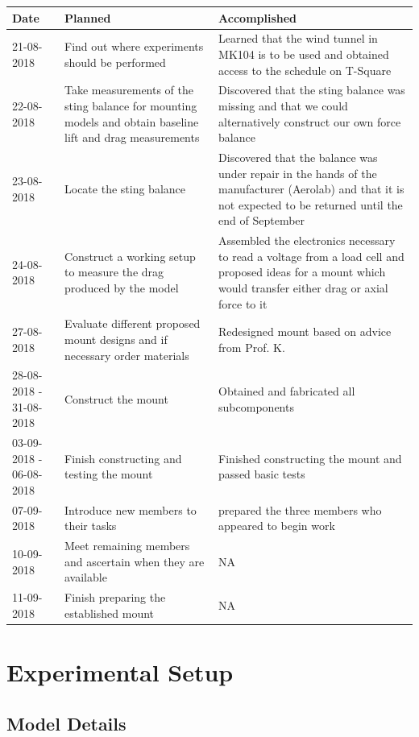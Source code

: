 \documentclass[12pt]{report} %
\begin{document}
\begin{tabular}{|l|p{10cm}|p{10cm}|}
\hline
Date & Planned & Accomplished \\ \hline
21-08-2018 & Find out where experiments should be performed & Learned that the wind tunnel in MK104 is to be
used and obtained access to the schedule on T-Square \\ \hline
22-08-2018 & Take measurements of the sting balance for mounting models and obtain baseline lift and drag measurements & 
Discovered that the sting balance was missing and that we could alternatively construct our own force balance \\ \hline
23-08-2018 & Locate the sting balance & Discovered that the balance was under repair in the hands of the manufacturer (Aerolab) and
that it is not expected to be returned until the end of September \\ \hline
24-08-2018 & Construct a working setup to measure the drag produced by the model & Assembled the electronics necessary to read a
voltage from a load cell and proposed ideas for a mount which would transfer either drag or axial force to it \\ \hline
27-08-2018 & Evaluate different proposed mount designs and if necessary order materials & Redesigned mount based on advice from Prof. K. \\ \hline
28-08-2018 - 31-08-2018 & Construct the mount & Obtained and fabricated all subcomponents \\ \hline
03-09-2018 - 06-08-2018 & Finish constructing and testing the mount & Finished constructing the mount and passed basic tests \\ \hline
07-09-2018 & Introduce new members to their tasks & prepared the three members who appeared to begin work \\ \hline
10-09-2018 & Meet remaining members and ascertain when they are available & NA \\ \hline
11-09-2018 & Finish preparing the established mount & NA \\ \hline

\end{tabular}

\chapter{Experimental Setup}

\section{Model Details}
\end{document}
